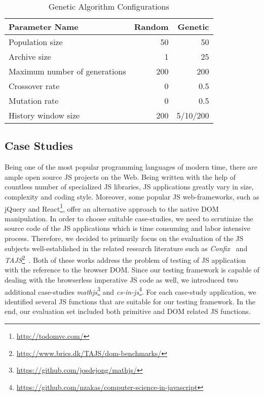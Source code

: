 \documentclass[sigconf]{acmart}
\begin{document}
\begin{table}
  \caption{Genetic Algorithm Configurations}
  \label{tbl.gen.config}
    \footnotesize
  \begin{tabular}{l|r|r}
    \toprule
    \textbf{Parameter Name} & \textbf{Random} & \textbf{Genetic} \\
    \midrule
    Population size                   & 50  & 50 \\
    Archive size                      & 1   & 25 \\
    Maximum number of generations     & 200 & 200 \\
    Crossover rate                    & 0   & 0.5 \\
    Mutation rate                     & 0   & 0.5 \\
    History window size               & 200 & 5/10/200 \\
    \bottomrule
  \end{tabular}
\end{table}


\subsection{Case Studies}
\label{sub.sec.case.studies}

Being one of the most popular programming languages of modern time, there are ample open source JS projects on the Web. Being written with the help of countless number of specialized JS libraries, JS applications greatly vary in size, complexity and coding style. Moreover, some popular JS web-frameworks, such as jQuery and React\footnote{\url{http://todomvc.com/}}, offer an alternative approach to the native DOM manipulation. In order to choose suitable case-studies, we need to scrutinize the source code of the JS applications which is time consuming and labor intensive process. Therefore, we decided to primarily focus on the evaluation of the JS subjects well-established in the related research literature such as \emph{Confix}~\cite{amin:ase15} and \emph{TAJS}\footnote{\url{http://www.brics.dk/TAJS/dom-benchmarks/}}~\cite{dom2011}. Both of these works address the problem of testing of JS application with the reference to the browser DOM. Since our testing framework is capable of dealing with the browserless imperative JS code as well, we introduced two additional case-studies \emph{mathjs}\footnote{\url{https://github.com/josdejong/mathjs/}} and \emph{cs-in-js}\footnote{\url{https://github.com/nzakas/computer-science-in-javascript}}. For each case-study application, we identified several JS functions that are suitable for our testing framework. In the end, our evaluation set included both primitive and DOM related JS functions.
\end{document}
